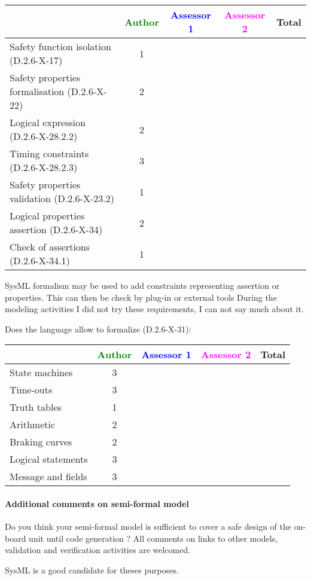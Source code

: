 \begin{tabular}{|l | c | c | c | c|}
\hline
& \textcolor{green}{Author} & \textcolor{blue}{Assessor 1} & \textcolor{magenta}{Assessor 2} & Total \\
\hline 
Safety function isolation (D.2.6-X-17)  & 1& & &  \\
\hline 
Safety properties formalisation (D.2.6-X-22)  &2 & & &  \\
\hline
Logical expression (D.2.6-X-28.2.2)  &2 & & &  \\
\hline
Timing constraints (D.2.6-X-28.2.3)  &3 & & &  \\
\hline
Safety properties validation (D.2.6-X-23.2)  &1 & & &  \\
\hline
Logical properties assertion (D.2.6-X-34)  &2 & & &  \\
\hline
Check  of assertions (D.2.6-X-34.1)  &1 & & &  \\
\hline
\end{tabular}
\begin{author_comment}
SysML formalism may be used to add constraints representing assertion
or properties. This can then be check by plug-in or external tools
During the modeling activities I did not try these requirements, I can
not say much about it.
\end{author_comment}
Does the language allow to  formalize (D.2.6-X-31):

\begin{tabular}{|l | c | c | c | c|}
\hline
& \textcolor{green}{Author} & \textcolor{blue}{Assessor 1} & \textcolor{magenta}{Assessor 2} & Total \\
\hline 
State machines  &3 & & &  \\
\hline
Time-outs  &3 & & &  \\
\hline
Truth tables  &1 & & &  \\
\hline
Arithmetic  &2 & & &  \\
\hline
Braking curves  &2 & & &  \\
\hline
Logical statements &3 & & &  \\
\hline
Message and fields &3 & & &  \\
\hline
\end{tabular}

\paragraph{Additional comments on semi-formal  model} Do you think your semi-formal  model is sufficient to cover a safe design of the on-board unit until code generation ?
All comments on links to  other models, validation and verification activities are welcomed.
\begin{author_comment}
SysML \cite{sysmlbook} is a good candidate for theses purposes.
\end{author_comment}
